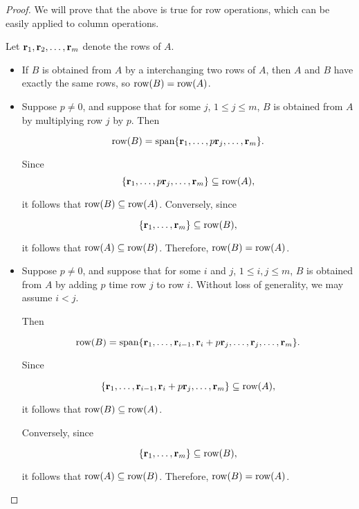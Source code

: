 \begin{proof}
We will prove that the above is true for row operations, which can be easily applied to column operations. 

Let $\mbox{\bf r}_1, \mbox{\bf r}_2, \ldots, \mbox{\bf r}_m$ denote the rows of $A$.

\begin{itemize}
\item If $B$ is obtained from $A$ by a interchanging two rows of $A$, then
$A$ and $B$ have exactly the same rows, so $\mbox{\rm row}(B)=\mbox{\rm row}(A)$.

\item
Suppose $p\neq 0$, and suppose that for some $j$, $1\leq j\leq m$,
$B$ is obtained from $A$ by multiplying row $j$ by $p$.
Then 

\[ \mbox{\rm row}(B)=\mbox{\rm span}\{\mbox{\bf r}_1, \ldots, 
p\mbox{\bf r}_{j}, \ldots, \mbox{\bf r}_m\}.  \]

Since
\[ \{\mbox{\bf r}_1, \ldots, 
p\mbox{\bf r}_{j}, \ldots, \mbox{\bf r}_m\} \subseteq\mbox{\rm row}(A),\]

it follows that $\mbox{\rm row}(B)\subseteq\mbox{\rm row}(A)$.
Conversely, since

\[ \{\mbox{\bf r}_1, \ldots, \mbox{\bf r}_m\}\subseteq\mbox{\rm row}(B),\]

it follows that $\mbox{\rm row}(A)\subseteq\mbox{\rm row}(B)$.
Therefore, $\mbox{\rm row}(B)=\mbox{\rm row}(A)$.

\item
Suppose $p\neq 0$, and suppose that for some $i$ and $j$,
$1\leq i,j\leq m$,
$B$ is obtained from $A$ by adding $p$ time row $j$ to row $i$.
Without loss of generality, we may assume $i<j$.

Then 

\[ \mbox{\rm row}(B)=\mbox{\rm span}\{\mbox{\bf r}_1, \ldots, \mbox{\bf r}_{i-1},
\mbox{\bf r}_i+p\mbox{\bf r}_j, \ldots,\mbox{\bf r}_j,\ldots, \mbox{\bf r}_m\}.  \]

Since

\[ \{\mbox{\bf r}_1, \ldots, \mbox{\bf r}_{i-1}, 
\mbox{\bf r}_i+p\mbox{\bf r}_{j}, \ldots, \mbox{\bf r}_m\} \subseteq\mbox{\rm row}(A),\]

it follows that $\mbox{\rm row}(B)\subseteq\mbox{\rm row}(A)$.

Conversely, since

\[ \{\mbox{\bf r}_1, \ldots, \mbox{\bf r}_m\}\subseteq\mbox{\rm row}(B),\]

it follows that $\mbox{\rm row}(A)\subseteq\mbox{\rm row}(B)$.
Therefore, $\mbox{\rm row}(B)=\mbox{\rm row}(A)$.
\end{itemize}
\end{proof}

